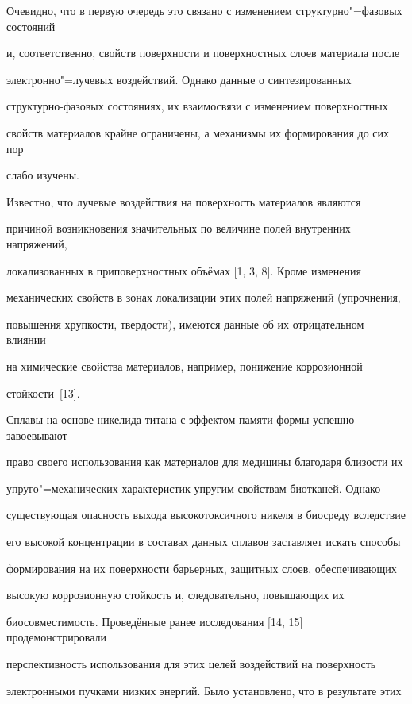 Очевидно, что в первую очередь это связано с изменением структурно"=фазовых состояний

и, соответственно, свойств поверхности и поверхностных слоев материала после

электронно"=лучевых воздействий. Однако данные о синтезированных

структурно-фазовых состояниях, их взаимосвязи с изменением поверхностных

свойств материалов крайне ограничены, а механизмы их формирования до сих пор

слабо изучены.



Известно, что лучевые воздействия на поверхность материалов являются

причиной возникновения значительных по величине полей внутренних напряжений,

локализованных в приповерхностных объёмах [1, 3, 8]. Кроме изменения

механических свойств в зонах локализации этих полей напряжений (упрочнения,

повышения хрупкости, твердости), имеются данные об их отрицательном влиянии

на химические свойства материалов, например, понижение коррозионной

стойкости~[13].



Сплавы на основе никелида титана с эффектом памяти формы успешно завоевывают

право своего использования как материалов для медицины благодаря близости их

упруго"=механических характеристик упругим свойствам биотканей. Однако

существующая опасность выхода высокотоксичного никеля в биосреду вследствие

его высокой концентрации в составах данных сплавов заставляет искать способы

формирования на их поверхности барьерных, защитных слоев, обеспечивающих

высокую коррозионную стойкость и, следовательно, повышающих их

биосовместимость. Проведённые ранее исследования [14, 15] продемонстрировали

перспективность использования для этих целей воздействий на поверхность

электронными пучками низких энергий. Было установлено, что в результате этих

